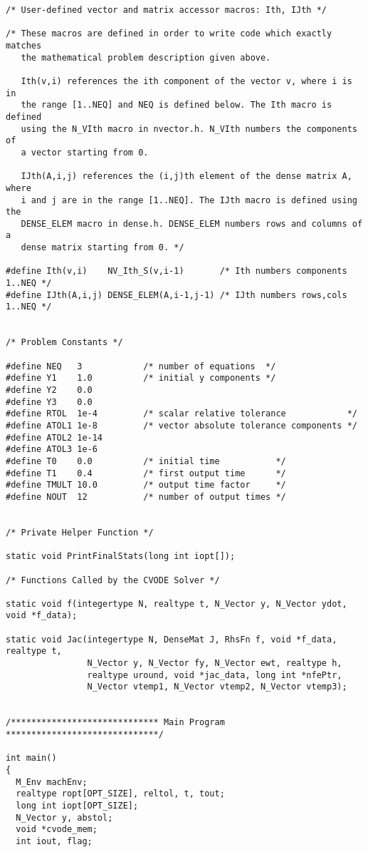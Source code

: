 \begin{verbatim}
/* User-defined vector and matrix accessor macros: Ith, IJth */

/* These macros are defined in order to write code which exactly matches
   the mathematical problem description given above.

   Ith(v,i) references the ith component of the vector v, where i is in
   the range [1..NEQ] and NEQ is defined below. The Ith macro is defined
   using the N_VIth macro in nvector.h. N_VIth numbers the components of
   a vector starting from 0.

   IJth(A,i,j) references the (i,j)th element of the dense matrix A, where
   i and j are in the range [1..NEQ]. The IJth macro is defined using the
   DENSE_ELEM macro in dense.h. DENSE_ELEM numbers rows and columns of a
   dense matrix starting from 0. */

#define Ith(v,i)    NV_Ith_S(v,i-1)       /* Ith numbers components 1..NEQ */
#define IJth(A,i,j) DENSE_ELEM(A,i-1,j-1) /* IJth numbers rows,cols 1..NEQ */


/* Problem Constants */

#define NEQ   3            /* number of equations  */
#define Y1    1.0          /* initial y components */
#define Y2    0.0
#define Y3    0.0
#define RTOL  1e-4         /* scalar relative tolerance            */
#define ATOL1 1e-8         /* vector absolute tolerance components */
#define ATOL2 1e-14
#define ATOL3 1e-6
#define T0    0.0          /* initial time           */
#define T1    0.4          /* first output time      */
#define TMULT 10.0         /* output time factor     */
#define NOUT  12           /* number of output times */


/* Private Helper Function */

static void PrintFinalStats(long int iopt[]);

/* Functions Called by the CVODE Solver */

static void f(integertype N, realtype t, N_Vector y, N_Vector ydot, void *f_data);

static void Jac(integertype N, DenseMat J, RhsFn f, void *f_data, realtype t,
                N_Vector y, N_Vector fy, N_Vector ewt, realtype h, 
                realtype uround, void *jac_data, long int *nfePtr, 
                N_Vector vtemp1, N_Vector vtemp2, N_Vector vtemp3);


/***************************** Main Program ******************************/

int main()
{
  M_Env machEnv;
  realtype ropt[OPT_SIZE], reltol, t, tout;
  long int iopt[OPT_SIZE];
  N_Vector y, abstol;
  void *cvode_mem;
  int iout, flag;


\end{verbatim}
